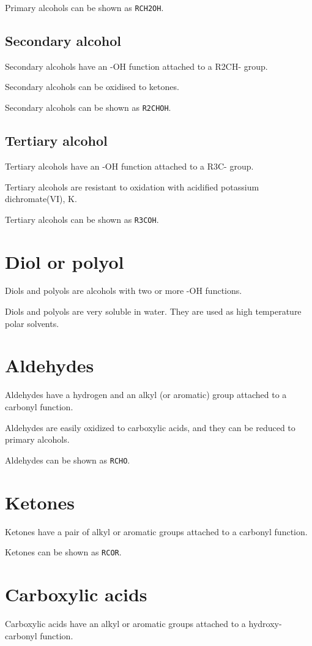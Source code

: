 \documentclass[12pt, oneside]{book}
\begin{document}
Primary alcohols can be shown as \texttt{RCH2OH}.

\subsection{Secondary alcohol}
Secondary alcohols have an -OH function attached to a R2CH- group.

Secondary alcohols can be oxidised to ketones.

Secondary alcohols can be shown as \texttt{R2CHOH}.

\subsection{Tertiary alcohol}
Tertiary alcohols have an -OH function attached to a R3C- group.

Tertiary alcohols are resistant to oxidation with acidified potassium
dichromate(VI), K.

Tertiary alcohols can be shown as \texttt{R3COH}.

\section{Diol or polyol}
Diols and polyols are alcohols with two or more -OH functions.

Diols and polyols are very soluble in water. They are used as high temperature
polar solvents.

\section{Aldehydes}
Aldehydes have a hydrogen and an alkyl (or aromatic) group attached to a
carbonyl function.

Aldehydes are easily oxidized to carboxylic acids, and they can be reduced to
primary alcohols.

Aldehydes can be shown as \texttt{RCHO}.

\section{Ketones}
Ketones have a pair of alkyl or aromatic groups attached to a carbonyl function.

Ketones can be shown as \texttt{RCOR}.

\section{Carboxylic acids}
Carboxylic acids have an alkyl or aromatic groups attached to a hydroxy-carbonyl
function.
\end{document}

